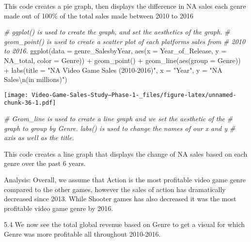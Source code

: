 \documentclass[
]{article}
\newenvironment{Shaded}{\begin{snugshade}}{\end{snugshade}}
\newcommand{\AttributeTok}[1]{\textcolor[rgb]{0.77,0.63,0.00}{#1}}
\newcommand{\CommentTok}[1]{\textcolor[rgb]{0.56,0.35,0.01}{\textit{#1}}}
\newcommand{\FunctionTok}[1]{\textcolor[rgb]{0.00,0.00,0.00}{#1}}
\newcommand{\NormalTok}[1]{#1}
\newcommand{\SpecialCharTok}[1]{\textcolor[rgb]{0.00,0.00,0.00}{#1}}
\newcommand{\StringTok}[1]{\textcolor[rgb]{0.31,0.60,0.02}{#1}}
\begin{document}
This code creates a pie graph, then displays the difference in NA sales
each genre made out of 100\% of the total sales made between 2010 to
2016

\begin{Shaded}
\begin{Highlighting}[]
\CommentTok{\# ggplot() is used to create the graph, and set the aesthetics of the graph.}
\CommentTok{\# geom\_point() is used to create a scatter plot of each platforms sales from}
\CommentTok{\# 2010 to 2016.}
\FunctionTok{ggplot}\NormalTok{(}\AttributeTok{data =}\NormalTok{ genre\_SalesbyYear, }\FunctionTok{aes}\NormalTok{(}\AttributeTok{x =}\NormalTok{ Year\_of\_Release, }\AttributeTok{y =}\NormalTok{ NA\_total, }\AttributeTok{color =}\NormalTok{ Genre)) }\SpecialCharTok{+}
    \FunctionTok{geom\_point}\NormalTok{() }\SpecialCharTok{+} \FunctionTok{geom\_line}\NormalTok{(}\FunctionTok{aes}\NormalTok{(}\AttributeTok{group =}\NormalTok{ Genre)) }\SpecialCharTok{+} \FunctionTok{labs}\NormalTok{(}\AttributeTok{title =} \StringTok{"NA Video Game Sales (2010{-}2016)"}\NormalTok{,}
    \AttributeTok{x =} \StringTok{"Year"}\NormalTok{, }\AttributeTok{y =} \StringTok{"NA Sales}\SpecialCharTok{\textbackslash{}n}\StringTok{(in millions)"}\NormalTok{)}
\end{Highlighting}
\end{Shaded}

\texttt{[image: Video-Game-Sales-Study--Phase-1-\_files/figure-latex/unnamed-chunk-36-1.pdf]}

\begin{Shaded}
\begin{Highlighting}[]
\CommentTok{\# Geom\_line is used to create a line graph and we set the aesthetic of the}
\CommentTok{\# graph to group by Genre. labs() is used to change the names of our x and y}
\CommentTok{\# axis as well as the title.}
\end{Highlighting}
\end{Shaded}

This code creates a line graph that displays the change of NA sales
based on each genre over the past 6 years.

Analysis: Overall, we assume that Action is the most profitable video
game genre compared to the other games, however the sales of action has
dramatically decreased since 2013. While Shooter games has also
decreased it was the most profitable video game genre by 2016.

5.4 We now see the total global revenue based on Genre to get a visual
for which Genre was more profitable all throughout 2010-2016.
\end{document}
